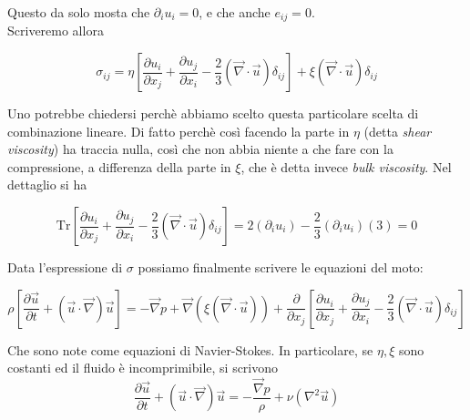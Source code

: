 \documentclass{report}
\begin{document}
Questo da solo mosta che $\partial_iu_i =0$, e che anche $e_{ij}=0$. \\

Scriveremo allora 
\begin{tcolorbox}[colback=myg!15, colframe=black, boxrule=1pt]
\begin{equation}
    \sigma_{ij} = \eta \left[\frac{\partial u_i}{\partial x_j} + \frac{\partial u_j}{\partial x_i} - \frac{2}{3}(\vec{\nabla}\cdot \vec{u})\delta_{ij}\right] + \xi (\vec{\nabla}\cdot \vec{u})\delta_{ij}
\end{equation}
\end{tcolorbox}

Uno potrebbe chiedersi perchè abbiamo scelto questa particolare scelta di combinazione lineare. Di fatto perchè così facendo la parte in $\eta$ (detta \emph{shear viscosity}) ha traccia nulla, così che non abbia niente a che fare con la compressione, a differenza della parte in $\xi$, che è detta invece \emph{bulk viscosity}. Nel dettaglio si ha 

\begin{equation}
    \text{Tr}\left[\frac{\partial u_i}{\partial x_j} + \frac{\partial u_j}{\partial x_i} - \frac{2}{3}(\vec{\nabla}\cdot \vec{u})\delta_{ij}\right] = 2(\partial_iu_i) - \frac{2}{3}(\partial_iu_i) (3) = 0 
\end{equation}

Data l'espressione di $\sigma$ possiamo finalmente scrivere le equazioni del moto: 

\begin{tcolorbox}[colback=myg!15, colframe=black, boxrule=1pt]
\begin{equation}
    \rho \left[\frac{\partial \vec{u}}{\partial t} + (\vec{u}\cdot \vec{\nabla})\vec{u}\right] = -\vec{\nabla}p + \vec{\nabla}(\xi (\vec{\nabla}\cdot \vec{u})) + \frac{\partial}{\partial x_j}\left[\frac{\partial u_i}{\partial x_j} + \frac{\partial u_j}{\partial x_i} - \frac{2}{3}(\vec{\nabla}\cdot \vec{u})\delta_{ij}\right]
\end{equation}
\end{tcolorbox}

Che sono note come equazioni di Navier-Stokes. In particolare, se $\eta, \xi$ sono costanti ed il fluido è incomprimibile, si scrivono 
\begin{equation}
 \frac{\partial \vec{u}}{\partial t} + (\vec{u}\cdot \vec{\nabla})\vec{u} = -\frac{\vec{\nabla}p}{\rho} + \nu (\nabla^2\vec{u})
\end{equation}
\end{document}
